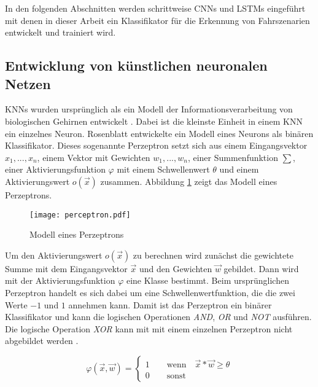 In den folgenden Abschnitten werden schrittweise \acp{CNN} und \acp{LSTM} eingeführt mit denen in dieser Arbeit ein Klassifikator für die Erkennung von Fahrszenarien entwickelt und trainiert wird.


\subsection{Entwicklung von künstlichen neuronalen Netzen}
\label{grundlagen_nn_entwicklung}

\acp{KNN} wurden ursprünglich als ein Modell der Informationsverarbeitung von biologischen Gehirnen entwickelt \cite{mcculloch1943logical}. Dabei ist die kleinste Einheit in einem \ac{KNN} ein einzelnes Neuron. Rosenblatt \cite{rosenblatt1958perceptron} entwickelte ein Modell eines Neurons als binären Klassifikator. Dieses sogenannte Perzeptron setzt sich aus einem Eingangsvektor $x_1, ..., x_n$, einem Vektor mit Gewichten $w_1, ..., w_n$, einer Summenfunktion $\sum$, einer Aktivierungsfunktion $\varphi$ mit einem Schwellenwert $\theta$ und einem Aktivierungswert $o(\vec{x})$ zusammen. Abbildung \ref{fig_perceptron} zeigt das Modell eines Perzeptrons.

\begin{figure}[h]
\centering
\texttt{[image: perceptron.pdf]}
\caption{Modell eines Perzeptrons \cite{rosenblatt1958perceptron}}
\label{fig_perceptron}
\end{figure}

Um den Aktivierungswert $o(\vec{x})$ zu berechnen wird zunächst die gewichtete Summe mit dem Eingangsvektor $\vec{x}$ und den Gewichten $\vec{w}$ gebildet. Dann wird mit der Aktivierungsfunktion $\varphi$ eine Klasse bestimmt. Beim ursprünglichen Perzeptron handelt es sich dabei um eine Schwellenwertfunktion, die die zwei Werte $-1$ und $1$ annehmen kann. Damit ist das Perzeptron ein binärer Klassifikator und kann die logischen Operationen \textit{AND}, \textit{OR} und \textit{NOT} ausführen. Die logische Operation \textit{XOR} kann mit mit einem einzelnen Perzeptron nicht abgebildet werden \cite{minski1969perceptrons}.

\begin{equation}
\varphi(\vec{x}, \vec{w}) = \begin{cases} 1 \qquad \text{wenn} \quad \vec{x}*\vec{w} \geq \theta \\ 0 \qquad \text{sonst} \end{cases}
\end{equation}

